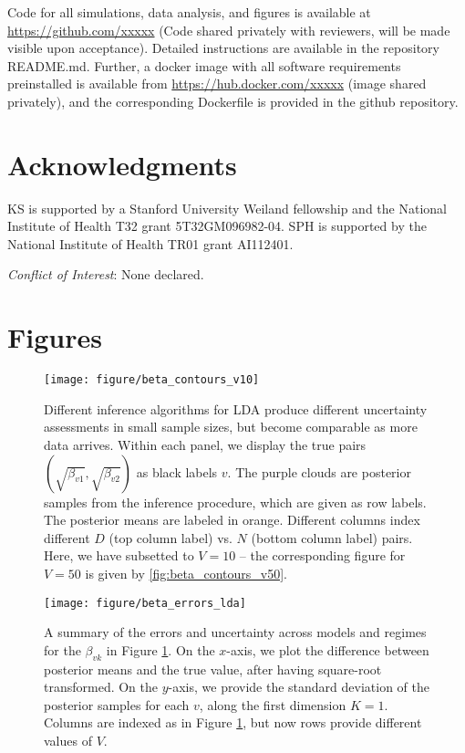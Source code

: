 \documentclass[oupdraft]{bio}
\begin{document}
{Code for all simulations, data analysis, and figures is available at
\url{https://github.com/xxxxx} (Code shared privately with reviewers, will be
made visible upon acceptance). Detailed instructions are available in the
repository README.md. Further, a docker image with all software requirements
preinstalled is available from \url{https://hub.docker.com/xxxxx} (image shared
privately), and the corresponding Dockerfile is provided in the github
repository.

\section*{Acknowledgments}

KS is supported by a Stanford University Weiland fellowship and the National
Institute of Health T32 grant 5T32GM096982-04. SPH is supported by the National
Institute of Health TR01 grant AI112401.

{\it Conflict of Interest}: None declared.




\section{Figures}

\begin{figure}[!p]
  \centering\texttt{[image: figure/beta\_contours\_v10]}
  \caption{Different inference algorithms for LDA produce different uncertainty
    assessments in small sample sizes, but become comparable as more data arrives.
    Within each panel, we display the true pairs $\left(\sqrt{\beta_{v1}},
    \sqrt{\beta_{v2}}\right)$ as black labels $v$. The purple clouds are
    posterior samples from the inference procedure, which are given as row labels. The
    posterior means are labeled in orange. Different columns index different $D$
    (top column label) vs. $N$ (bottom column label) pairs. Here, we have
    subsetted to $V = 10$ -- the corresponding figure for $V = 50$ is given by
    \ref{fig:beta_contours_v50}.
  }
  \label{fig:beta_contours_v10}
\end{figure}

\begin{figure}[!p]
  \centering
  \texttt{[image: figure/beta\_errors\_lda]}
  \caption{A summary of the errors and uncertainty across models and regimes for
    the $\beta_{vk}$ in Figure \ref{fig:beta_contours_v10}. On the $x$-axis,
    we plot the difference between posterior means and the true value, after
    having square-root transformed. On the $y$-axis, we provide the standard
    deviation of the posterior samples for each $v$, along the first dimension
    $K = 1$. Columns are indexed as in Figure \ref{fig:beta_contours_v10}, but
    now rows provide different values of $V$.
    \label{fig:beta_errors_lda} }
\end{figure}

}
\end{document}
